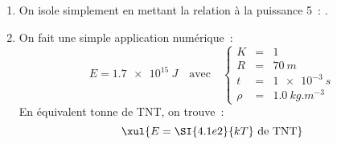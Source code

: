 \documentclass[../main/main.tex]{subfiles}
\begin{document}
{\begin{enumerate}
\begin{tcbraster}[raster columns=2, raster equal height=rows]
\begin{tcb}
			      \end{tcb}
		      \end{tcbraster}
		      \begin{tcb}(tool){Outils}

			      \begin{itemize}
				      \item $\dim{E} = \rm M\cdot L^2\cdot T^{-2}$~;
				      \item $\dim{t} = \rm T$~;
				      \item $\dim{\rho} = \rm M\cdot L^{-3}$.
			      \end{itemize}

		      \end{tcb}
		      \begin{tcb}(appl){Application}
			      $\dim{R} = L$, donc on a
			      \[ L = \left( M\cdot L^2\cdot T^{-2} \right)^\alpha T^\beta \left(
				      M\cdot L^{-3} \right)^\gamma\]
			      Soit
			      \[\left\{
				      \begin{array}{rcl}
					      1 & = & 2\alpha - 3\gamma \\
					      0 & = & -2\alpha + \beta  \\
					      0 & = & \alpha + \gamma
				      \end{array}
				      \right.\Longleftrightarrow
				      \left\{
				      \begin{array}{rcl}
					      \alpha & = & -\gamma \\
					      \alpha & = & \beta/2 \\
					      \alpha & = & 1/5
				      \end{array}
				      \right.\]
			      Ainsi,
			      \[\left\{
				      \begin{array}{rcl}
					      \alpha & = & 1/5  \\
					      \gamma & = & -1/5 \\
					      \beta  & = & 2/5
				      \end{array}
				      \right.\]
			      Soit
			      \[R = K\times E^{1/5}t^{2/5}\rho^{-1/5}\]
		      \end{tcb}

		\item On isole simplement en mettant la relation à la puissance 5~: .

		\item On fait une simple application numérique~:
		      \[E = \SI{1.7e15}{J}\quad\text{avec}\quad \left\{
			      \begin{array}{rcl}
				      K    & = & 1                   \\
				      R    & = & \SI{70}{m}          \\
				      t    & = & \SI{1e-3}{s}        \\
				      \rho & = & \SI{1.0}{kg.m^{-3}}
			      \end{array}
			      \right.\]
		      En équivalent tonne de TNT, on trouve~:
		      \[\xul{E = \SI{4.1e2}{kT}\text{ de TNT}}\]
	\end{enumerate}
}
\end{document}
